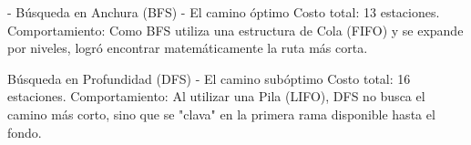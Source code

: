 \documentclass[10pt,a4paper]{article}
\begin{document}
\begin{alerta}{-}
    Búsqueda en Anchura (BFS) - El camino óptimo
    Costo total: 13 estaciones.
    Comportamiento: Como BFS utiliza una estructura de Cola (FIFO) y se expande por niveles, logró encontrar matemáticamente la ruta más corta.

    Búsqueda en Profundidad (DFS) - El camino subóptimo
    Costo total: 16 estaciones.
    Comportamiento: Al utilizar una Pila (LIFO), DFS no busca el camino más corto, sino que se "clava" en la primera rama disponible hasta el fondo.

\end{alerta}
\end{document}
